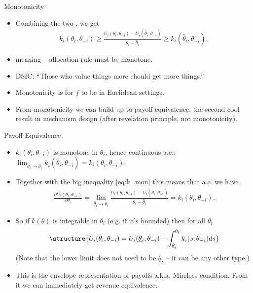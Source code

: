 \documentclass[english,10pt
,aspectratio=169
]{beamer}
\begin{document}
\begin{frame}{Monotonicity}
\begin{itemize}
	\item Combining the two , we get
	{\small \vspace{-0.5em}\begin{align}
		\label{eq:k_mon}
			k_i(\theta_i,\theta_{-i}) 
			\geq 
			\frac{ U_i(\theta_i, \theta_{-i}) - U_i(\hat{\theta}_i, \theta_{-i}) }{ \theta_i - \hat{\theta}_i } 
			\geq 
			k_i(\hat{\theta}_i,\theta_{-i}),
		\end{align}\vspace{-1em}}
	\pause
	\item meaning  -- allocation rule must be \alert{monotone}.
	\item DSIC: ``Those who value things more should get more things.''
	\item \alert{Monotonicity} is  for $f$ to be  in \alert{Euclidean} settings.
	\item From monotonicity we can build up to \alert{payoff equivalence}, 
	the second cool result in mechanism design (after revelation principle, not monotonicity).
\end{itemize}
\end{frame}


\begin{frame}{Payoff Equivalence}
\begin{itemize}
	\item $k_i(\theta_i,\theta_{-i})$ is monotone in $\theta_i$, hence continuous a.e.: $\lim_{\hat{\theta}_i \to \theta_i} k_i(\hat{\theta}_i,\theta_{-i}) = k_i(\theta_i,\theta_{-i})$.
	\pause
	\item Together with the big inequality \eqref{eq:k_mon}	this means that a.e. we have
	\pause
	\begin{align*}
		\frac{\partial U_i(\theta_i,\theta_{-i})}{\partial \theta_i} = \lim_{\hat{\theta}_i \to \theta_i} \frac{ U_i(\theta_i, \theta_{-i}) - U_i(\hat{\theta}_i, \theta_{-i}) }{ \theta_i - \hat{\theta}_i }  = k_i(\theta_i,\theta_{-i}).
	\end{align*}
	\pause
	\item So if $k(\theta)$ is integrable in $\theta_i$ (e.g. if it's bounded) then for all $\theta_i$
	\begin{align*}
	\structure{
		U_i(\theta_i, \theta_{-i}) = U_i (\underline{\theta}_i,\theta_{-i}) + \int_{\underline{\theta}_i}^{\theta_i} k_i(s,\theta_{-i}) d s
	}
	\end{align*}
	(Note that the lower limit does not need to be $\underline{\theta}_i$ -- it can be any other type.)
	\item This is the \alert{envelope representation of payoffs} a.k.a. Mirrlees condition. From it we can immediately get revenue equivalence.
\end{itemize}
\end{frame}
\end{document}
